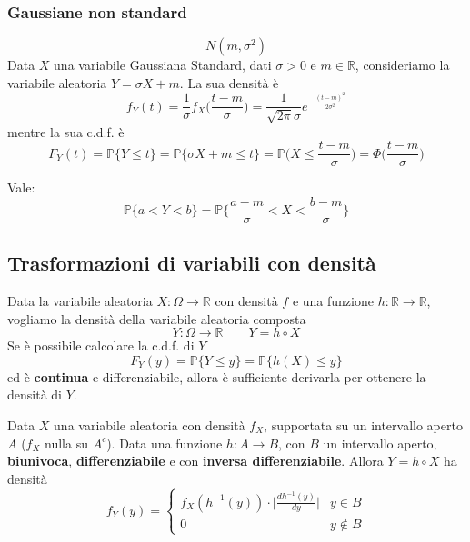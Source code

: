 \subsubsection{Gaussiane non standard}
\begin{equation}
	N(m, \sigma^2)
\end{equation}
Data $X$ una variabile Gaussiana Standard, dati $\sigma >0$ e $m \in \mathbb{R}$, consideriamo la variabile aleatoria $Y = \sigma X +m$. La sua densità è
\begin{equation}
	f_Y(t) = \frac{1}{\sigma}f_X\bigg(\frac{t-m}{\sigma}\bigg) = \frac{1}{\sqrt{2 \pi}\sigma}e^{-\frac{(t-m)^2}{2\sigma^2}}
\end{equation}
mentre la sua c.d.f. è
\begin{equation}
	F_Y(t)= \mathbb{P}\{Y \leq t\} = \mathbb{P}\{\sigma X + m \leq t\} = \mathbb{P}\bigg(X \leq \frac{t-m}{\sigma}\bigg) = \Phi \bigg(\frac{t-m}{\sigma}\bigg)
\end{equation}

\begin{observation}
	Vale:
	\begin{equation}
		\mathbb{P}\{a < Y < b\} = \mathbb{P}\bigg\{\frac{a-m}{\sigma} < X < \frac{b-m}{\sigma}\bigg\}
	\end{equation}
\end{observation}

\subsection{Trasformazioni di variabili con densità}
Data la variabile aleatoria $X: \Omega \to \mathbb{R}$ con densità $f$ e una funzione $h: \mathbb{R} \to \mathbb{R}$, vogliamo la densità della variabile aleatoria composta 
\begin{equation*}
	Y: \Omega \to \mathbb{R} \quad\quad Y=h \circ X
\end{equation*}
Se è possibile calcolare la c.d.f. di $Y$
\begin{equation*}
	F_Y(y)=\mathbb{P}\{Y \leq y\} = \mathbb{P}\{h(X) \leq y\}
\end{equation*}
ed è \textbf{continua} e differenziabile, allora è sufficiente derivarla per ottenere la densità di $Y$.
\begin{proposition}
	Data $X$ una variabile aleatoria con densità $f_X$, supportata su un intervallo aperto $A$ ($f_X$ nulla su $A^c$). Data una funzione $h: A \to B$, con $B$ un intervallo aperto, \textbf{biunivoca}, \textbf{differenziabile} e con \textbf{inversa differenziabile}. Allora $Y = h \circ X$ ha densità
	\begin{equation}
		f_Y(y)=\begin{cases}
			f_X(h^{-1}(y)) \cdot \bigg\lvert \frac{dh^{-1}(y)}{dy}\bigg\rvert & y \in B\\
			0 & y \notin B
		\end{cases}
	\end{equation}
\end{proposition}

